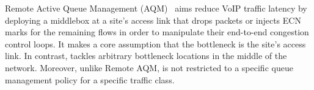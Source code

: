  Remote Active Queue Management (AQM)~\cite{ardelean} aims reduce VoIP traffic latency by deploying a middlebox at a site's access link that drops packets or injects ECN marks for the remaining flows in order to manipulate their end-to-end congestion control loops. It makes a core assumption that the bottleneck is the site's access link.
In contrast, \name tackles arbitrary bottleneck locations in the middle of the network. Moreover, unlike Remote AQM, \name is not restricted to a specific queue management policy for a specific traffic class.


